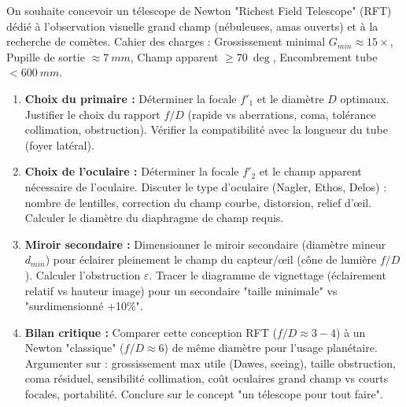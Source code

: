 \documentclass[11pt]{article}
\begin{document}
\begin{exercice}
On souhaite concevoir un télescope de Newton "Richest Field Telescope" (RFT) dédié à l'observation visuelle grand champ (nébuleuses, amas ouverts) et à la recherche de comètes. Cahier des charges : Grossissement minimal $G_{min} \approx 15\times$, Pupille de sortie $\approx \SI{7}{mm}$, Champ apparent $\ge \SI{70}{\deg}$, Encombrement tube $< \SI{600}{mm}$.
\begin{enumerate}
    \item \textbf{Choix du primaire :} Déterminer la focale $f'_1$ et le diamètre $D$ optimaux. Justifier le choix du rapport $f/D$ (rapide vs aberrations, coma, tolérance collimation, obstruction). Vérifier la compatibilité avec la longueur du tube (foyer latéral).
    \item \textbf{Choix de l'oculaire :} Déterminer la focale $f'_2$ et le champ apparent nécessaire de l'oculaire. Discuter le type d'oculaire (Nagler, Ethos, Delos) : nombre de lentilles, correction du champ courbe, distorsion, relief d'œil. Calculer le diamètre du diaphragme de champ requis.
    \item \textbf{Miroir secondaire :} Dimensionner le miroir secondaire (diamètre mineur $d_{min}$) pour éclairer pleinement le champ du capteur/œil (cône de lumière $f/D$). Calculer l'obstruction $\varepsilon$. Tracer le diagramme de vignettage (éclairement relatif vs hauteur image) pour un secondaire "taille minimale" vs "surdimensionné +10\%".
    \item \textbf{Bilan critique :} Comparer cette conception RFT ($f/D \approx 3-4$) à un Newton "classique" ($f/D \approx 6$) de même diamètre pour l'usage planétaire. Argumenter sur : grossissement max utile (Dawes, seeing), taille obstruction, coma résiduel, sensibilité collimation, coût oculaires grand champ vs courts focales, portabilité. Conclure sur le concept "un télescope pour tout faire".
\end{enumerate}
\end{exercice}
\end{document}
